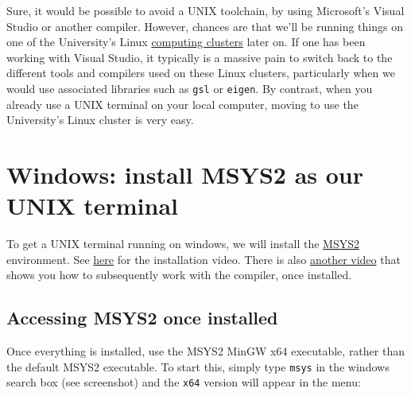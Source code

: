 \documentclass[
]{book}
\begin{document}
Sure, it would be possible to avoid a UNIX toolchain, by using Microsoft's Visual Studio or another compiler. However, chances are that we'll be running things on one of the University's Linux \href{https://universityofexeteruk.sharepoint.com/sites/CornwallARC}{computing clusters} later on. If one has been working with Visual Studio, it typically is a massive pain to switch back to the different tools and compilers used on these Linux clusters, particularly when we would use associated libraries such as \texttt{gsl} or \texttt{eigen}. By contrast, when you already use a UNIX terminal on your local computer, moving to use the University's Linux cluster is very easy.

\hypertarget{windows-install-msys2-as-our-unix-terminal}{%
\section{Windows: install MSYS2 as our UNIX terminal}\label{windows-install-msys2-as-our-unix-terminal}}

To get a UNIX terminal running on windows, we will install the \href{https://www.msys2.org/}{MSYS2} environment. See \href{https://recapexeter.cloud.panopto.eu/Panopto/Pages/Viewer.aspx?id=f2acdf3c-224e-49be-8ae3-ad2400f2b3c1\&start=0}{here} for the installation video. There is also \href{https://recapexeter.cloud.panopto.eu/Panopto/Pages/Viewer.aspx?id=376342e6-5791-4c25-b2e3-ad2400ffe304\&start=0}{another video} that shows you how to subsequently work with the compiler, once installed.

\hypertarget{accessing-msys2-once-installed}{%
\subsection{Accessing MSYS2 once installed}\label{accessing-msys2-once-installed}}

Once everything is installed, use the MSYS2 MinGW x64 executable, rather than the default MSYS2 executable. To start this, simply type \texttt{msys} in the windows search box (see screenshot) and the \texttt{x64} version will appear in the menu:
\end{document}
